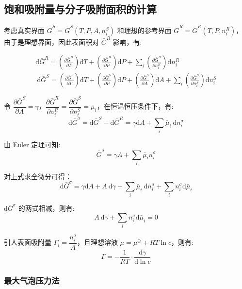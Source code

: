 \subsection{饱和吸附量与分子吸附面积的计算}

考虑真实界面 $\bar{G}^S=\bar{G}^S\left(T, P, A, n_i^S\right)$ 和理想的参考界面 $\bar{G}^R=\bar{G}^R\left(T, P, n_i^R\right)$，由于是理想界面，因此表面积对 $\bar{G}^R$ 影响，有:

$$
\begin{gathered}
\mathrm{d} \bar{G}^R=\left(\frac{\partial \bar{G}^R}{\partial T}\right) \mathrm{d} T+\left(\frac{\partial \bar{G}^R}{\partial P}\right) \mathrm{d} P+\sum_i\left(\frac{\partial \bar{G}^R}{\partial n_i^R}\right) \mathrm{d} n_i^R \\
\mathrm{~d} \bar{G}^S=\left(\frac{\partial \bar{G}^S}{\partial T}\right) \mathrm{d} T+\left(\frac{\partial \bar{G}^S}{\partial P}\right) \mathrm{d} P+\left(\frac{\partial \bar{G}^S}{\partial A}\right) \mathrm{d} A+\sum_i\left(\frac{\partial \bar{G}^S}{\partial n_i^S}\right) \mathrm{d} n_i^S
\end{gathered}
$$

令 $\dfrac{\partial \bar{G}^S}{\partial A}=\gamma$，$\dfrac{\partial \bar{G}^R}{\partial n_i^R}=\dfrac{\partial \bar{G}^S}{\partial n_i^S}=\bar{\mu}_i$，在恒温恒压条件下，有:
$$
\mathrm{d} \bar{G}^\sigma=\mathrm{d} \bar{G}^S-\mathrm{d} \bar{G}^R=\gamma \mathrm{d} A+\sum_i \bar{\mu}_i \mathrm{~d} n_i^\sigma
$$

由 Euler 定理可知:
$$
\bar{G}^\sigma=\gamma A+\sum_i \bar{\mu}_i n_i^\sigma
$$

对上式求全微分可得：
$$
\mathrm{d} \bar{G}^\sigma=\gamma \mathrm{d} A+A \mathrm{~d} \gamma+\sum_i \bar{\mu}_i \mathrm{~d} n_i^\sigma+\sum_i n_i^\sigma \mathrm{d} \bar{\mu}_i
$$

$\mathrm{d} \bar{G}^\sigma$ 的两式相减，则有:
$$
A \mathrm{~d} \gamma+\sum_i n_i^\sigma \mathrm{d} \bar{\mu}_i=0
$$

引人表面吸附量 $\Gamma_i=\dfrac{n_i^\sigma}{A}$，且理想溶液 $\mu=\mu^{\ominus}+R T \ln c$，则有:
\begin{equation}\label{eq:2}
    \Gamma=-\frac{1}{R T} \cdot \frac{\mathrm{d} \gamma}{\mathrm{d} \ln c}
\end{equation}

\subsubsection{最大气泡压力法}

